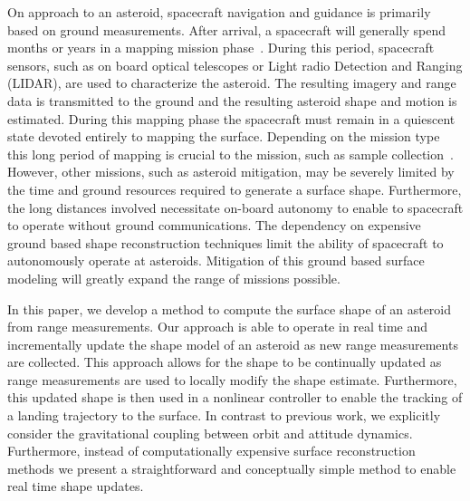 \documentclass[letterpaper, paper,11pt]{AAS}		%
\begin{document}
On approach to an asteroid, spacecraft navigation and guidance is primarily based on ground measurements.
After arrival, a spacecraft will generally spend months or years in a mapping mission phase~\cite{kubota2003,cole1998}.
During this period, spacecraft sensors, such as on board optical telescopes or Light radio Detection and Ranging (LIDAR), are used to characterize the asteroid.
The resulting imagery and range data is transmitted to the ground and the resulting asteroid shape and motion is estimated. 
During this mapping phase the spacecraft must remain in a quiescent state devoted entirely to mapping the surface.
Depending on the mission type this long period of mapping is crucial to the mission, such as sample collection~\cite{gates2015}. 
However, other missions, such as asteroid mitigation, may be severely limited by the time and ground resources required to generate a surface shape.
Furthermore, the long distances involved necessitate on-board autonomy to enable to spacecraft to operate without ground communications.
The dependency on expensive ground based shape reconstruction techniques limit the ability of spacecraft to autonomously operate at asteroids.
Mitigation of this ground based surface modeling will greatly expand the range of missions possible.

In this paper, we develop a method to compute the surface shape of an asteroid from range measurements.
Our approach is able to operate in real time and incrementally update the shape model of an asteroid as new range measurements are collected.
This approach allows for the shape to be continually updated as range measurements are used to locally modify the shape estimate.
Furthermore, this updated shape is then used in a nonlinear controller to enable the tracking of a landing trajectory to the surface.
In contrast to previous work, we explicitly consider the gravitational coupling between orbit and attitude dynamics.
Furthermore, instead of computationally expensive surface reconstruction methods we present a straightforward and conceptually simple method to enable real time shape updates. 


\end{document}
